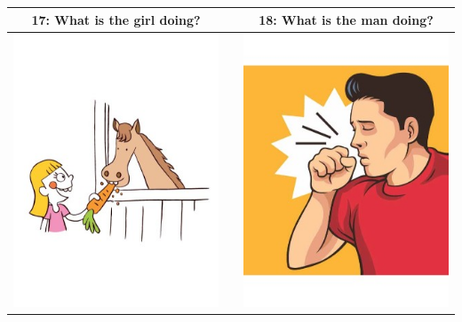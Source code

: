 \documentclass[12pt,notitlepage]{article}
\begin{document}
\begin{center}
\begin{tabular}{|c|c|c|}
\hline
17: What is the girl doing? && 18: What is the man doing? \\
\hline
\includegraphics[width=20em,trim=0 0 0 -3]{figures/I17.jpg} & & \includegraphics[width=20em,trim=0 0 0 -3]{figures/I18.jpg} \\
\hline
\end{tabular}
\vspace{1em} \\



\end{center}
\end{document}
